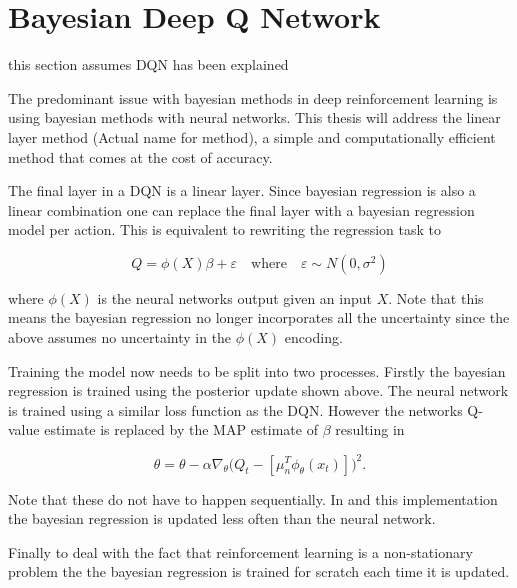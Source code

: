 \section{Bayesian Deep Q Network}

\todo this section assumes DQN has been explained

The predominant issue with bayesian methods in deep reinforcement learning is using bayesian methods with neural networks. This thesis will address the linear layer method (\todo Actual name for method), a simple and computationally efficient method that comes at the cost of accuracy. 

The final layer in a DQN is a linear layer. Since bayesian regression is also a linear combination one can replace the final layer with a bayesian regression model per action. This is equivalent to rewriting the regression task to 

\begin{equation*}
	Q = \phi(X)\beta + \varepsilon \quad \text{where} \quad \varepsilon \sim N(0,\sigma^2)
\end{equation*}

where $\phi(X)$ is the neural networks output given an input $X$. Note that this means the bayesian regression no longer incorporates all the uncertainty since the above assumes no uncertainty in the $\phi(X)$ encoding. 

Training the model now needs to be split into two processes. Firstly the bayesian regression is trained using the posterior update shown above. The neural network is trained using a similar loss function as the DQN. However the networks Q-value estimate is replaced by the MAP estimate of $\beta$ resulting in

\begin{equation*}
	\theta = \theta - \alpha\nabla_\theta\big(Q_t - [\mu_n^T\phi_\theta(x_t)]\big)^2.
\end{equation*}

Note that these do not have to happen sequentially. In \cite{azziz_2018} and this implementation the bayesian regression is updated less often than the neural network.

Finally to deal with the fact that reinforcement learning is a non-stationary problem the the bayesian regression is trained for scratch each time it is updated.

\cleardoublepage